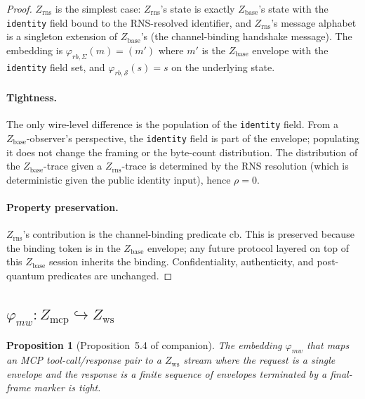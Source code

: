 \documentclass[11pt]{article}
\newtheorem{proposition}[theorem]{Proposition}
\theoremstyle{definition}
\theoremstyle{remark}
\newcommand{\Zb}{Z_{\mathrm{base}}}
\newcommand{\Zw}{Z_{\mathrm{ws}}}
\newcommand{\Zr}{Z_{\mathrm{rns}}}
\newcommand{\Zm}{Z_{\mathrm{mcp}}}
\begin{document}
\begin{proof}
$\Zr$ is the simplest case: $\Zr$'s state is exactly $\Zb$'s state
with the \texttt{identity} field bound to the RNS-resolved
identifier, and $\Zr$'s message alphabet is a singleton extension of
$\Zb$'s (the channel-binding handshake message). The embedding is
$\varphi_{rb,\Sigma}(m) = (m')$ where $m'$ is the $\Zb$ envelope
with the \texttt{identity} field set, and
$\varphi_{rb,\mathcal{S}}(s) = s$ on the underlying state.

\paragraph{Tightness.}
The only wire-level difference is the population of the
\texttt{identity} field. From a $\Zb$-observer's perspective, the
\texttt{identity} field is part of the envelope; populating it does
not change the framing or the byte-count distribution. The
distribution of the $\Zb$-trace given a $\Zr$-trace is determined by
the RNS resolution (which is deterministic given the public identity
input), hence $\rho = 0$.

\paragraph{Property preservation.}
$\Zr$'s contribution is the channel-binding predicate $\mathrm{cb}$.
This is preserved because the binding token is in the $\Zb$
envelope; any future protocol layered on top of this $\Zb$ session
inherits the binding. Confidentiality, authenticity, and
post-quantum predicates are unchanged.
\end{proof}

\subsection{$\varphi_{mw} : \Zm \hookrightarrow \Zw$}

\begin{proposition}[Proposition~5.4 of companion]
\label{prop:mw-proof}
The embedding $\varphi_{mw}$ that maps an MCP tool-call/response
pair to a $\Zw$ stream where the request is a single envelope and
the response is a finite sequence of envelopes terminated by a
final-frame marker is tight.
\end{proposition}
\end{document}

